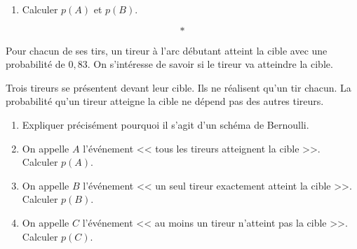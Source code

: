 \documentclass[10pt,french]{book}
\begin{document}
\begin{center}
\end{center}

\begin{enumerate}[resume]
    \item Calculer $p(A)$ et $p(B)$.
\end{enumerate}\[*\]

\exo Pour chacun de ses tirs, un tireur à l'arc débutant atteint la cible avec une probabilité de $0,83$. On s'intéresse de savoir si le tireur va atteindre la cible.\par
Trois tireurs se présentent devant leur cible. Ils ne réalisent qu'un tir chacun. La probabilité qu'un tireur atteigne la cible ne dépend pas des autres tireurs.

\begin{enumerate}
    \item Expliquer précisément pourquoi il s'agit d'un schéma de Bernoulli.
    \item On appelle $A$ l'événement << tous les tireurs atteignent la cible >>. Calculer $p(A)$.
    \item On appelle $B$ l'événement << un seul tireur exactement atteint la cible >>. Calculer $p(B)$.
    \item On appelle $C$ l'événement << au moins un tireur n'atteint pas la cible >>. Calculer $p(C)$.
\end{enumerate}

\clearpage
\end{document}
